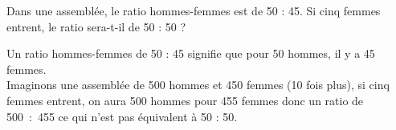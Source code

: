 \begin{exercice*}
   Dans une assemblée, le ratio hommes-femmes est de 50 : 45. Si cinq femmes entrent, le ratio sera-t-il de 50 : 50 ?
\end{exercice*}
\begin{corrige}
   Un ratio hommes-femmes de 50 : 45 signifie que pour 50 hommes, il y a 45 femmes. \\
   Imaginons une assemblée de 500 hommes et 450 femmes (10 fois plus), si cinq femmes entrent, on aura 500 hommes pour 455 femmes donc un ratio de 500~:~455 ce qui n'est {\color{red} pas équivalent à 50 : 50.}
\end{corrige}
